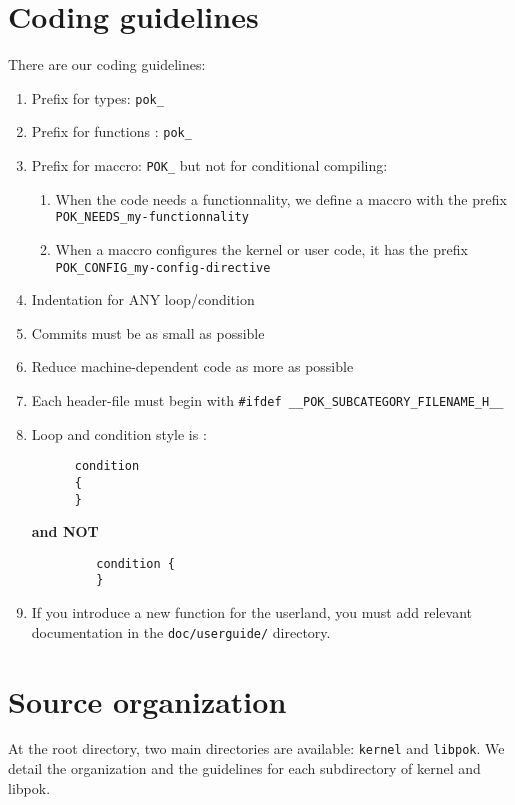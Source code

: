 \documentclass[oneside]{article}
\begin{document}
\section{Coding guidelines}
There are our coding guidelines:
\begin{enumerate}
    \item
      Prefix for types: \texttt{pok\_}
   \item
      Prefix for functions : \texttt{pok\_}
   \item
      Prefix for maccro: \texttt{POK\_} but not for conditional compiling:
      \begin{enumerate}
         \item
            When the code needs a functionnality, we define a maccro with the prefix \texttt{POK\_NEEDS\_my-functionnality}
         \item
            When a maccro configures the kernel or user code, it has the prefix \\ \texttt{POK\_CONFIG\_my-config-directive}
      \end{enumerate}
   \item
      Indentation for ANY loop/condition
   \item
      Commits must be as small as possible
   \item
      Reduce machine-dependent code as more as possible
   \item
      Each header-file must begin with \texttt{\#ifdef \_\_POK\_SUBCATEGORY\_FILENAME\_H\_\_}
   \item
      Loop and condition style is :
      \begin{verbatim}
      condition 
      {
      }
      \end{verbatim}
   \textbf{and NOT}
      \begin{verbatim}
         condition {
         }
      \end{verbatim}
   \item
      If you introduce a new function for the userland, you must add relevant
      documentation in the \texttt{doc/userguide/} directory.
\end{enumerate}


\section{Source organization}
At the root directory, two main directories are available: \texttt{kernel} and
\texttt{libpok}. We detail the organization and the guidelines for each
subdirectory of kernel and libpok.
\end{document}
